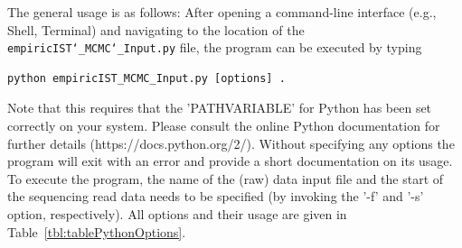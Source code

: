 \documentclass[12pt,a4paper]{scrartcl}
\begin{document}
The general usage is as follows: After opening a command-line interface (e.g., Shell, Terminal) and navigating to the location of the \texttt{empiricIST\char`_MCMC\char`_Input.py} file, the program can be executed by typing
\begin{lstlisting}
python empiricIST_MCMC_Input.py [options] .
\end{lstlisting}

Note that this requires that the 'PATHVARIABLE' for Python has been set correctly on your system. Please consult the online Python documentation for further details (https://docs.python.org/2/). Without specifying any options the program will exit with an error and provide a short documentation on its usage. To execute the program, the name of the (raw) data input file and the start of the sequencing read data needs to be specified (by invoking the '-f' and '-s' option, respectively). All options and their usage are given in Table~\ref{tbl:tablePythonOptions}.
\end{document}
